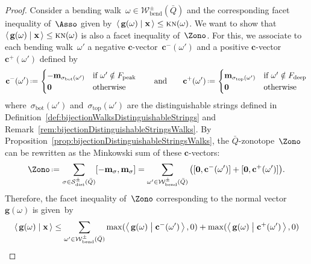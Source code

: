 \documentclass{amsart}
\theoremstyle{definition}
\renewcommand{\b}[1]{\mathbf{#1}} %
\newcommand{\dotprod}[2]{\left\langle \, #1 \; \middle| \; #2 \, \right\rangle} %
\newcommand{\eqdef}{\mbox{\,\raisebox{0.2ex}{\scriptsize\ensuremath{\mathrm:}}\ensuremath{=}\,}} %
\newcommand{\distinguishableStrings}{\mathcal{S}_\mathrm{dist}} %
\newcommand{\bendingWalks}{\mathcal{W}_\mathrm{bend}} %
\newcommand{\KN}{\textsc{kn}} %
\newcommand{\peak}{\mathrm{peak}} %
\newcommand{\deep}{\mathrm{deep}} %
\renewcommand{\top}{\mathrm{top}} %
\newcommand{\bottom}{\mathrm{bot}} %
\newcommand{\gvector}[1]{\mathbf{g}(#1)} %
\newcommand{\multiplicityVector}{\b{m}} %
\begin{document}
\begin{proof}
Consider a bending walk~$\omega \in \bendingWalks^\pm(\bar Q)$ and the corresponding facet inequality of~$\Asso$ given by~${\dotprod{\gvector{\omega}}{\b{x}} \le \KN(\omega)}$.
We want to show that~$\dotprod{\gvector{\omega}}{\b{x}} \le \KN(\omega)$ is also a facet inequality of~$\Zono$.
For this, we associate to each bending walk~$\omega'$ a negative $\b{c}$-vector~$\b{c}^-(\omega')$ and a positive $\b{c}$-vector~$\b{c}^+(\omega')$ defined by
\[
\b{c}^-(\omega') \eqdef
\begin{cases}
-\multiplicityVector_{\sigma_\bottom(\omega')} & \text{if } \omega' \notin F_\peak \\
\b{0} & \text{otherwise}
\end{cases}
\qquad\text{and}\qquad
\b{c}^+(\omega') \eqdef 
\begin{cases}
\multiplicityVector_{\sigma_\top(\omega')} & \text{if } \omega' \notin F_\deep \\
\b{0} & \text{otherwise}
\end{cases}
\]
where~$\sigma_\bottom(\omega')$ and~$\sigma_\top(\omega')$ are the distinguishable strings defined in Definition~\ref{def:bijectionWalksDistinguishableStrings} and Remark~\ref{rem:bijectionDistinguishableStringsWalks}.
By Proposition~\ref{prop:bijectionDistinguishableStringsWalks}, the $\bar Q$-zonotope~$\Zono$ can be rewritten as the Minkowski sum of these $\b{c}$-vectors:
\[
\Zono \eqdef \sum_{\sigma \in \distinguishableStrings^\pm(\bar Q)} [-\multiplicityVector_\sigma, \multiplicityVector_\sigma] = \sum_{\omega' \in \bendingWalks^\pm(\bar Q)} \big( [\b{0}, \b{c}^-(\omega')] + [\b{0}, \b{c}^+(\omega')] \big).
\]
Therefore, the facet inequality of~$\Zono$ corresponding to the normal vector~$\gvector{\omega}$ is given~by
\[
\dotprod{\gvector{\omega}}{\b{x}} \le \sum_{\omega' \in \bendingWalks^\pm(\bar Q)} \max(\dotprod{\gvector{\omega}}{\b{c}^-(\omega')},0) + \max(\dotprod{\gvector{\omega}}{\b{c}^+(\omega')},0) \\
\]


\end{proof}
\end{document}

